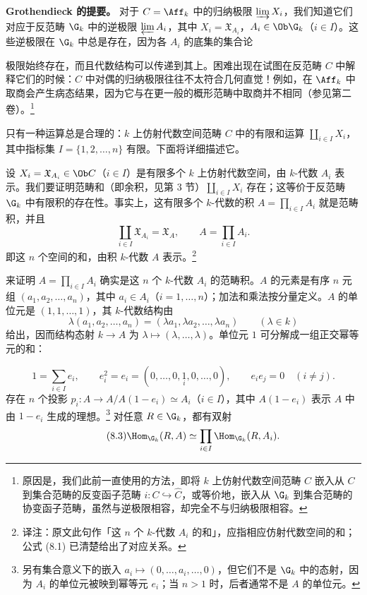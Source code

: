 \textbf{Grothendieck 的提要。} 对于 $C=\Aff_k$ 中的归纳极限 $\varinjlim X_i$，我们知道它们对应于反范畴 $\G_k$ 中的逆极限 $\varprojlim A_i$，其中 $X_i=\mathfrak X_{A_i}$，$A_i\in\Ob\G_k$（$i\in I$）。这些逆极限在 $\G_k$ 中总是存在，因为各 $A_i$ 的底集的集合论

极限始终存在，而且代数结构可以传递到其上。困难出现在试图在反范畴 $C$ 中解释它们的时候：$C$ 中对偶的归纳极限往往不太符合几何直觉！例如，在 $\Aff_k$ 中取商会产生病态结果，因为它与在更一般的概形范畴中取商并不相同（参见第二卷）。\footnote{原因是，我们此前一直使用的方法，即将 $k$ 上仿射代数空间范畴 $C$ 嵌入从 $C$ 到集合范畴的反变函子范畴 $i:C\hookrightarrow\widehat C$，或等价地，嵌入从 $\G_k$ 到集合范畴的协变函子范畴，虽然与逆极限相容，却完全不与归纳极限相容。}

只有一种运算总是合理的：$k$ 上仿射代数空间范畴 $C$ 中的有限和运算 $\coprod_{i\in I}X_i$，其中指标集 $I=\{1,2,\ldots,n\}$ 有限。下面将详细描述它。

设 $X_i=\mathfrak X_{A_i}\in\Ob C$（$i\in I$）是有限多个 $k$ 上仿射代数空间，由 $k$-代数 $A_i$ 表示。我们要证明范畴和（即余积，见第 3 节）$\coprod_{i\in I}X_i$ 存在；这等价于反范畴 $\G_k$ 中有限积的存在性。事实上，这有限多个 $k$-代数的积 $A=\prod_{i\in I}A_i$ 就是范畴积，并且
\begin{equation}\tag{8.1}
\coprod_{i\in I}\mathfrak X_{A_i}=\mathfrak X_A,
\qquad A=\prod_{i\in I}A_i.
\end{equation}
即这 $n$ 个空间的和，由积 $k$-代数 $A$ 表示。\footnote{译注：原文此句作「这 $n$ 个 $k$-代数 $A_i$ 的和」，应指相应仿射代数空间的和；公式 (8.1) 已清楚给出了对应关系。}

来证明 $A=\prod_{i\in I}A_i$ 确实是这 $n$ 个 $k$-代数 $A_i$ 的范畴积。$A$ 的元素是有序 $n$ 元组 $(a_1,a_2,\ldots,a_n)$，其中 $a_i\in A_i$（$i=1,\ldots,n$）；加法和乘法按分量定义。$A$ 的单位元是 $(1,1,\ldots,1)$，其 $k$-代数结构由
\[
\lambda(a_1,a_2,\ldots,a_n)=(\lambda a_1,\lambda a_2,\ldots,\lambda a_n)
\qquad(\lambda\in k)
\]
给出，因而结构态射 $k\to A$ 为 $\lambda\mapsto(\lambda,\ldots,\lambda)$。单位元 $1$ 可分解成一组正交幂等元的和：

\begin{equation}\tag{8.2}
1=\sum_{i\in I}e_i,\qquad
 e_i^2=e_i=(0,\ldots,0,\underset{i}{1},0,\ldots,0),
\qquad e_ie_j=0\quad(i\ne j).
\end{equation}
存在 $n$ 个投影 $p_i:A\to A/A(1-e_i)\simeq A_i$（$i\in I$），其中 $A(1-e_i)$ 表示 $A$ 中由 $1-e_i$ 生成的理想。\footnote{另有集合意义下的嵌入 $a_i\mapsto(0,\ldots,a_i,\ldots,0)$，但它们不是 $\G_k$ 中的态射，因为 $A_i$ 的单位元被映到幂等元 $e_i$；当 $n>1$ 时，后者通常不是 $A$ 的单位元。}
对任意 $R\in\G_k$，都有双射
\begin{equation}\tag{8.3}
\Hom_{\G_k}(R,A)\simeq\prod_{i\in I}\Hom_{\G_k}(R,A_i).
\end{equation}

